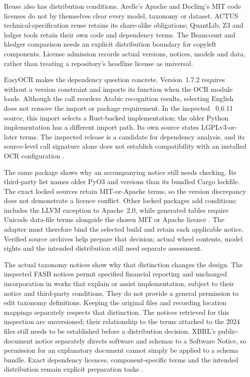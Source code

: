 Reuse also has distribution conditions. Arelle's Apache and Docling's MIT code
licenses do not by themselves clear every model, taxonomy or dataset. ACTUS
technical-specification reuse retains its share-alike obligations; QuantLib,
Z3 and ledger tools retain their own code and dependency terms. The Beancount
and hledger comparison needs an explicit distribution boundary for copyleft
components. License admission records actual versions, notices, models and
data, rather than treating a repository's headline license as universal.

\enlargethispage{\baselineskip}
EasyOCR makes the dependency question concrete. Version~1.7.2 requires
 without a version constraint and imports its
 function when the OCR module loads. Although the call
reorders Arabic recognition results, selecting English does not remove the
import or package requirement. In the inspected ~0.6.11
source, this import selects a Rust-backed implementation; the older Python
implementation has a different import path. Its own source states
LGPLv3-or-later terms. The inspected release is a candidate for dependency
analysis, and its source-level call signature alone does not establish
compatibility with an installed OCR configuration
\citep{easyocr172source,pythonbidi0611source}.

The same package shows why an accompanying notice still needs checking. Its
third-party list names older PyO3 and  versions than its
bundled Cargo lockfile. The exact locked sources retain MIT-or-Apache terms,
so the version discrepancy does not demonstrate a licence conflict. Other
locked packages add conditions:  includes the LLVM
exception to Apache~2.0, while generated  tables require
Unicode data-file terms alongside the chosen MIT or Apache licence
\citep{pythonbidi0611source,bidirustsources2026}. The adapter must therefore
bind the selected build and retain each applicable notice. Verified source
archives help prepare that decision; actual wheel contents, model rights
and the intended distribution still need separate assessment.

The actual taxonomy notices show why that distinction changes the design.
The inspected FASB notices permit specified financial reporting and unchanged
incorporation in works that explain or assist implementation, subject to their
notice and third-party conditions. They do not provide a general permission to
edit taxonomy definitions. Keeping the original files and recording location
mappings separately respects that distinction. The notices retrieved for this
inspection are unversioned; their relationship to the terms attached to the
2024 files still needs to be established before a distribution decision.
XBRL's public-document notice separately directs software and schemas to a
Software Notice, so permission for an explanatory document cannot simply be
applied to a schema bundle. Exact dependency licences, component-specific terms
and the intended distribution remain explicit preparation tasks
\citep{fasbtaxonomyuses,fasbsrtuses,xbrlcopyright}.
